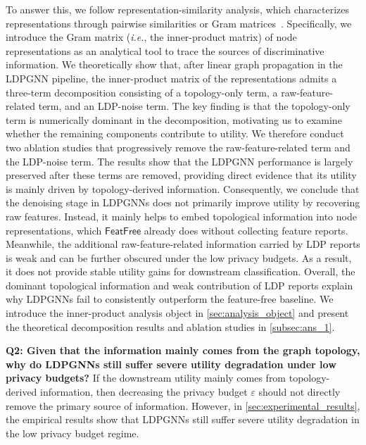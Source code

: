 \documentclass[conference,compsoc]{IEEEtran}
\newcommand{\ie}{\textit{i.e.}\xspace}
\theoremstyle{boldplain}
\theoremstyle{bolddefinition}
\theoremstyle{remark}
\newcommand{\ff}{\ensuremath{\mathsf{FeatFree}}\xspace}
\newcommand{\ldpgnn}{LDPGNN\xspace}
\newcommand{\ldpgnns}{LDPGNNs\xspace}
\begin{document}
To answer this, we follow representation-similarity analysis, which characterizes representations through pairwise similarities or Gram matrices~\cite{kriegeskorte2008rsa,kornblith2019similarity,ding2021grounding,cui2022deconfounded}. 
Specifically, we introduce the Gram matrix (\ie, the inner-product matrix) of node representations as an analytical tool to trace the sources of discriminative information.
We theoretically show that, after linear graph propagation in the \ldpgnn pipeline, the inner-product matrix of the representations admits a three-term decomposition consisting of a topology-only term, a raw-feature-related term, and an LDP-noise term. 
\textcolor{purple!80}{
The key finding is that the topology-only term is numerically dominant in the decomposition, motivating us to examine whether the remaining components contribute to utility.
We therefore conduct two ablation studies that progressively remove the raw-feature-related term and the LDP-noise term.
The results show that the \ldpgnn performance is largely preserved after these terms are removed, providing direct evidence that its utility is mainly driven by topology-derived information.
}
Consequently, we conclude that the denoising stage in \ldpgnns does not primarily improve utility by recovering raw features.
Instead, it mainly helps to embed topological information into node representations, which \ff already does without collecting feature reports.
Meanwhile, the additional raw-feature-related information carried by LDP reports is weak and can be further obscured under the low privacy budgets.
As a result, it does not provide stable utility gains for downstream classification.
Overall, the dominant topological information and weak contribution of LDP reports explain why \ldpgnns fail to consistently outperform the feature-free baseline.
We introduce the inner-product analysis object in \autoref{sec:analysis_object} and present the theoretical decomposition results and ablation studies in \autoref{subsec:ans_1}.

\vspace{0.1cm}

\noindent
\textbf{Q2: Given that the information mainly comes from the graph topology, why do \ldpgnns still suffer severe utility degradation under low privacy budgets?}
If the downstream utility mainly comes from topology-derived information, then decreasing the privacy budget $\varepsilon$ should not directly remove the primary source of information. 
However, in \autoref{sec:experimental_results}, the empirical results show that \ldpgnns still suffer severe utility degradation in the low privacy budget regime.
\end{document}
